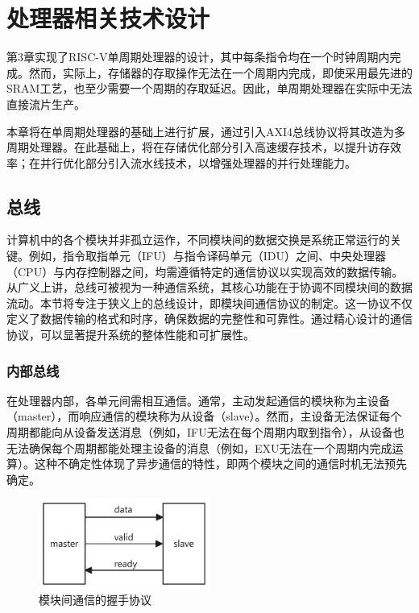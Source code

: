

\chapter{处理器相关技术设计}
第3章实现了RISC-V单周期处理器的设计，其中每条指令均在一个时钟周期内完成。然而，实际上，存储器的存取操作无法在一个周期内完成，即使采用最先进的SRAM工艺，也至少需要一个周期的存取延迟\cite{noguchi2008best}。因此，单周期处理器在实际中无法直接流片生产。

本章将在单周期处理器的基础上进行扩展，通过引入AXI4总线协议将其改造为多周期处理器。在此基础上，将在存储优化部分引入高速缓存技术，以提升访存效率；在并行优化部分引入流水线技术，以增强处理器的并行处理能力。

\section{总线}
计算机中的各个模块并非孤立运作，不同模块间的数据交换是系统正常运行的关键。例如，指令取指单元（IFU）与指令译码单元（IDU）之间、中央处理器（CPU）与内存控制器之间，均需遵循特定的通信协议以实现高效的数据传输。从广义上讲，总线可被视为一种通信系统，其核心功能在于协调不同模块间的数据流动。本节将专注于狭义上的总线设计，即模块间通信协议的制定。这一协议不仅定义了数据传输的格式和时序，确保数据的完整性和可靠性。通过精心设计的通信协议，可以显著提升系统的整体性能和可扩展性。

\subsection{内部总线}
在处理器内部，各单元间需相互通信。通常，主动发起通信的模块称为主设备（master），而响应通信的模块称为从设备（slave）。然而，主设备无法保证每个周期都能向从设备发送消息（例如，IFU无法在每个周期内取到指令），从设备也无法确保每个周期都能处理主设备的消息（例如，EXU无法在一个周期内完成运算）。这种不确定性体现了异步通信的特性，即两个模块之间的通信时机无法预先确定。

\begin{figure}[htbp]
	\centering
	\includegraphics[width=0.5\textwidth]{image/handshake.pdf}
	\caption{模块间通信的握手协议}
	\label{fig:handshake}
\end{figure}

